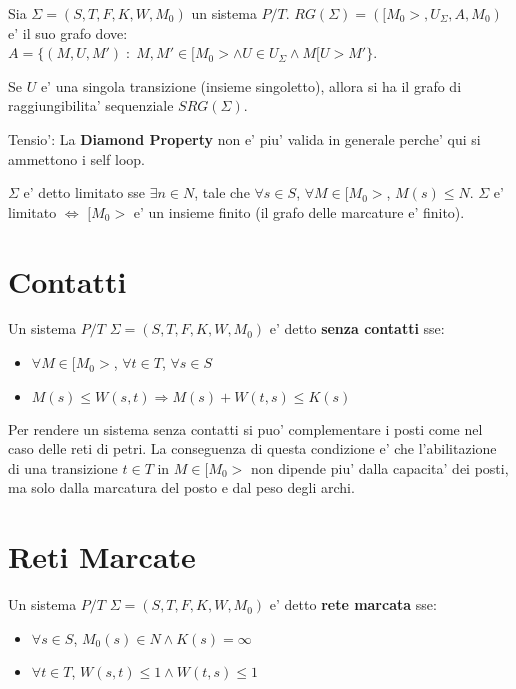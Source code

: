 Sia $\Sigma = (S, T, F, K, W, M_0)$ un sistema $P/T$. $RG(\Sigma) = ([M_0>, U_\Sigma, A, M_0)$ e' il suo grafo dove: \\

$A = \{ (M, U, M') \; : \; M,M' \in [M_0> \land U \in U_\Sigma \land M[U>M' \}$.

Se $U$ e' una singola transizione (insieme singoletto), allora si ha il grafo di raggiungibilita' sequenziale $SRG(\Sigma)$.

Tensio': La \textbf{Diamond Property} non e' piu' valida in generale perche' qui si ammettono i self loop.

$\Sigma$ e' detto limitato sse $\exists n \in N$, tale che $\forall s \in S$, $\forall M \in [M_0>$, $M(s) \leq N$.
$\Sigma$ e' limitato $\Leftrightarrow$ $[M_0>$ e' un insieme finito (il grafo delle marcature e' finito).


\section{Contatti}

Un sistema $P/T$ $\Sigma = (S, T, F, K, W, M_0)$ e' detto \textbf{senza contatti} sse:
\begin{itemize}
  \item $\forall M \in [M_0>$, $\forall t \in T$, $\forall s \in S$
  \item $M(s) \leq W(s, t) \Rightarrow M(s) + W(t, s) \leq K(s)$
\end{itemize}

Per rendere un sistema senza contatti si puo' complementare i posti come nel caso delle reti di petri.
La conseguenza di questa condizione e' che l'abilitazione di una transizione $t \in T$ in $M \in [M_0>$ non dipende piu' dalla capacita' dei posti, ma solo dalla marcatura del posto e dal peso degli archi.

\section{Reti Marcate}

Un sistema $P/T$ $\Sigma = (S, T, F, K, W, M_0)$ e' detto \textbf{rete marcata} sse:

\begin{itemize}
  \item $\forall s \in S$, $M_0(s) \in N \land K(s) = \infty$
  \item $\forall t \in T$, $W(s, t) \leq 1 \land W(t, s) \leq 1$
\end{itemize}

